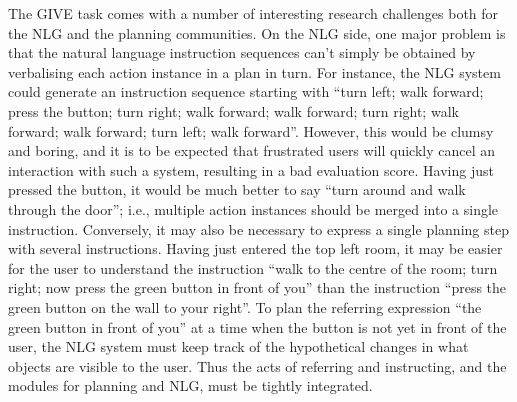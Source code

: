 The GIVE task comes with a number of interesting research challenges
both for the NLG and the planning communities.  On the NLG side, one
major problem is that the natural language instruction sequences can't
simply be obtained by verbalising each action instance in a plan in
turn.  For instance, the NLG system could generate an instruction
sequence starting with ``turn left; walk forward; press the button;
turn right; walk forward; walk forward; turn right; walk forward; walk
forward; turn left; walk forward''.  However, this would be clumsy and
boring, and it is to be expected that frustrated users will quickly
cancel an interaction with such a system, resulting in a bad
evaluation score.  Having just pressed the button, it would be much
better to say ``turn around and walk through the door''; i.e.,
multiple action instances should be merged into a single
instruction. Conversely, it may also be necessary to express a single
planning step with several instructions.  Having just entered the top
left room, it may be easier for the user to understand the instruction
``walk to the centre of the room; turn right; now press the green
button in front of you'' than the instruction ``press the green button
on the wall to your right''.  To plan the referring expression ``the
green button in front of you'' at a time when the button is not yet in
front of the user, the NLG system must keep track of the hypothetical
changes in what objects are visible to the user.  Thus the acts of
referring and instructing, and the modules for planning and NLG, must
be tightly integrated.

